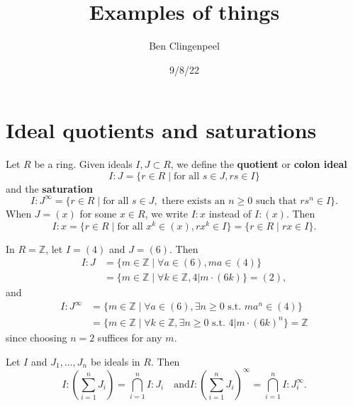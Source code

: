 \documentclass[12pt]{article}
\title{Examples of things}
\author{Ben Clingenpeel}
\date{9/8/22}
\newenvironment{proposition}[2][Proposition]{\begin{trivlist}
\item[\hskip \labelsep {\bfseries #1}\hskip \labelsep {\bfseries #2.}]}{\end{trivlist}}
\newenvironment{example}[2][Example]{\begin{trivlist}
\item[\hskip \labelsep {\bfseries #1}\hskip \labelsep {\bfseries #2.}]}{\end{trivlist}}
\newenvironment{definition}[2][Definition]{\begin{trivlist}
\item[\hskip \labelsep {\bfseries #1}\hskip \labelsep {\bfseries #2.}]}{\end{trivlist}}
\newcommand{\Z}{\mathbb{Z}}
\begin{document}
\maketitle


\section{Ideal quotients and saturations}

\begin{definition}{1}
	Let $R$ be a ring. Given ideals $I, J \subset R$, we define the \textbf{quotient} or \textbf{colon ideal} \[ I:J = \{ r \in R \mid \text{for all } s \in J, rs \in I \} \] and the \textbf{saturation} \[ I:J^\infty = \{r \in R \mid \text{for all } s \in J, \text{ there exists an } n \geq 0 \text{ such that } rs^n \in I\}. \] When $J = (x)$ for some $x \in R$, we write $I:x$ instead of $I:(x)$. Then \[ I:x = \{r \in R \mid \text{for all } x^k \in (x), rx^k \in I\} = \{r \in R \mid rx \in I\}. \]
\end{definition}


\begin{example}{1}
	In $R = \Z$, let $I = (4)$ and $J = (6)$. Then \begin{align*}
		I:J &= \{m \in \Z \mid \forall a \in (6), ma \in (4)\} \\
		&= \{m \in \Z \mid \forall k \in \Z, 4 | m \cdot (6k) \} = (2),
	\end{align*} and \begin{align*}
		I:J^\infty &= \{m \in \Z \mid \forall a \in (6), \exists n \geq 0 \text{ s.t. } ma^n \in (4)\} \\
		&= \{m \in \Z \mid \forall k \in \Z, \exists n \geq 0 \text{ s.t. } 4 | m \cdot (6k)^n \} = \Z
	\end{align*} since choosing $n = 2$ suffices for any $m$. 
\end{example}


\begin{proposition}{4.4.13 \cite{cox2013ideals}}
	Let $I$ and $J_1, \dots, J_n$ be ideals in $R$. Then \[ I : \left(\sum_{i=1}^n J_i\right) = \bigcap_{i=1}^n I:J_i \quad \text{and} I : \left(\sum_{i = 1}^n J_i\right)^\infty = \bigcap_{i = 1}^n I:J_i^\infty. \]
\end{proposition}
\end{document}
